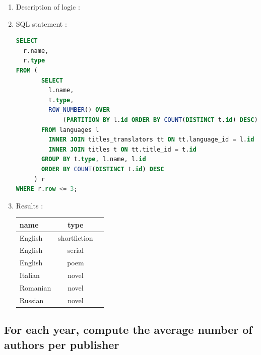 \documentclass[doubleside, titlepage]{article}
\begin{document}
	\begin{enumerate}
	\item Description of logic : %
	\item SQL statement :
		\begin{lstlisting}[language=SQL,showspaces=false,basicstyle=\ttfamily,numberstyle=\tiny,commentstyle=\color{gray}]
SELECT
  r.name,
  r.type
FROM (
       SELECT
         l.name,
         t.type,
         ROW_NUMBER() OVER 
             (PARTITION BY l.id ORDER BY COUNT(DISTINCT t.id) DESC) as row
       FROM languages l
         INNER JOIN titles_translators tt ON tt.language_id = l.id
         INNER JOIN titles t ON tt.title_id = t.id
       GROUP BY t.type, l.name, l.id
       ORDER BY COUNT(DISTINCT t.id) DESC
     ) r
WHERE r.row <= 3;
		\end{lstlisting}

	\item Results :\\

	\begin{tabular}{|l|c|r|}
	  \hline
		name & type\\
	  \hline
		English	& shortfiction \\
		English	& serial \\
		English	& poem \\
		Italian	& novel \\
		Romanian & novel \\
		Russian	& novel \\
	  \hline
	\end{tabular}
\end{enumerate}

\subsection{For each year, compute the average number of authors per publisher}
\end{document}
